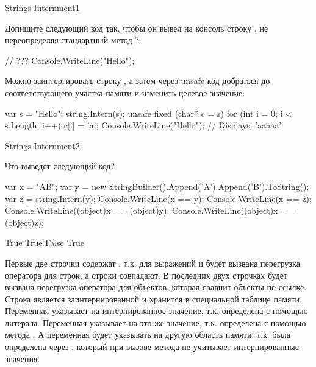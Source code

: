\begin{defproblem}{Strings-Internment1}
\begin{onlyproblem}
  Допишите следующий код так, чтобы он вывел на консоль строку , не переопределяя стандартный метод ?
  \begin{source}
  // ???
  Console.WriteLine("Hello");
  \end{source}
\end{onlyproblem}
\begin{onlysolution}
  Можно заинтергировать строку , а затем через unsafe-код добраться до соответствующего участка памяти и изменить целевое значение:  
  \begin{source}
  var s = "Hello";
  string.Intern(s);
  unsafe
  {
    fixed (char* c = s)
      for (int i = 0; i < s.Length; i++)
        c[i] = 'a';
  }
  Console.WriteLine("Hello"); // Displays: 'aaaaa'
  \end{source}
\end{onlysolution}
\end{defproblem}
\begin{defproblem}{Strings-Internment2}
\begin{onlyproblem}
  Что выведет следующий код?
  \begin{source}
  var x = "AB";
  var y = new StringBuilder().Append('A').Append('B').ToString(); 
  var z = string.Intern(y);
  Console.WriteLine(x == y);
  Console.WriteLine(x == z);
  Console.WriteLine((object)x == (object)y);
  Console.WriteLine((object)x == (object)z);
  \end{source}
\end{onlyproblem}
\begin{onlysolution}
  \begin{source}
  True
  True
  False
  True
  \end{source}
  Первые две строчки содержат , т.к. для выражений  и  будет вызвана перегрузка оператора \code{==} для строк, а строки совпадают. В последних двух строчках будет вызвана перегрузка оператора \code{==} для объектов, которая сравнит объекты по ссылке. Строка  является заинтернированной и хранится в специальной таблице памяти. Переменная  указывает на интернированное значение, т.к. определена с помощью литерала. Переменная  указывает на это же значение, т.к. определена с помощью метода . А переменная  будет указывать на другую область памяти, т.к. была определена через , который при вызове метода  не учитывает интернированные значения.
\end{onlysolution}
\end{defproblem}
